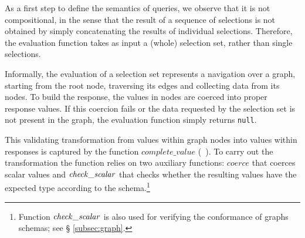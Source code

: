 





As a first step to define the semantics of queries, we observe that it
is not compositional, in the sense that the result of a sequence of
selections is not obtained by simply concatenating the results of
individual selections. Therefore, the evaluation function takes as
input a (whole) selection set, rather than single selections. 

Informally, the evaluation of a selection set represents a navigation
over a graph, starting from the root node, traversing its edges and
collecting data from its nodes. To build the response, the values in
nodes are coerced into proper response values. If this coercion
fails or the data requested by the selection set is not present in the
graph, the evaluation function simply returns \texttt{null}.

This validating transformation from values within graph nodes into
values within responses is captured by the function
$\mathit{complete\_value}$ (\cf~\cite[\S6.4.3]{gqlspec}). To carry out
the transformation the function relies on two auxiliary functions:
$\mathit{coerce}$ that coerces scalar values and $\mathit{check\_scalar}$
that checks whether the resulting values have the expected type
according to the schema.\footnote{Function $\mathit{check\_scalar}$ is also used
for verifying the conformance of graphs \wrt schemas; see \S
\ref{subsec:graph}.}





